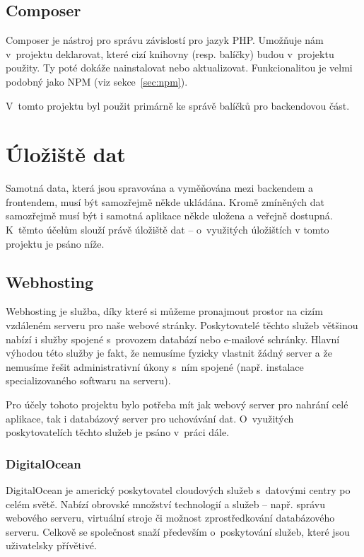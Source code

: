 	\subsection{Composer}\label{sec:composer}
	Composer je nástroj pro správu závislostí pro jazyk PHP. Umožňuje nám v~projektu deklarovat, které cizí knihovny (resp. balíčky) budou v~projektu použity. Ty poté dokáže nainstalovat nebo aktualizovat. Funkcionalitou je velmi podobný jako NPM (viz sekce~\ref{sec:npm}). \cite{Composer}
	
	V~tomto projektu byl použit primárně ke správě balíčků pro backendovou část.
		
\section{Úložiště dat}
Samotná data, která jsou spravována a vyměňována mezi backendem a frontendem, musí být samozřejmě někde ukládána. Kromě zmíněných dat samozřejmě musí být i samotná aplikace někde uložena a veřejně dostupná. K~těmto účelům slouží právě úložiště dat – o~využitých úložištích v tomto projektu je psáno níže.

	\subsection{Webhosting}
	Webhosting je služba, díky které si můžeme pronajmout prostor na cizím vzdáleném serveru pro naše webové stránky. Poskytovatelé těchto služeb většinou nabízí i služby spojené s~provozem databází nebo e-mailové schránky. Hlavní výhodou této služby je fakt, že nemusíme fyzicky vlastnit žádný server a že nemusíme řešit administrativní úkony s~ním spojené (např. instalace specializovaného softwaru na serveru). \cite{Webhosting}
	
	Pro účely tohoto projektu bylo potřeba mít jak webový server pro nahrání celé aplikace, tak i databázový server pro uchovávání dat. O~využitých poskytovatelích těchto služeb je psáno v~práci dále. 
	
		\subsubsection{DigitalOcean}\label{sec:do}
		DigitalOcean je americký poskytovatel cloudových služeb s~datovými centry po celém světě. Nabízí obrovské množství technologií a služeb – např. správu webového serveru, virtuální stroje či možnost zprostředkování databázového serveru. Celkově se společnost snaží především o~poskytování služeb, které jsou uživatelsky přívětivé. \cite{DO1}\cite{DO2}
		

